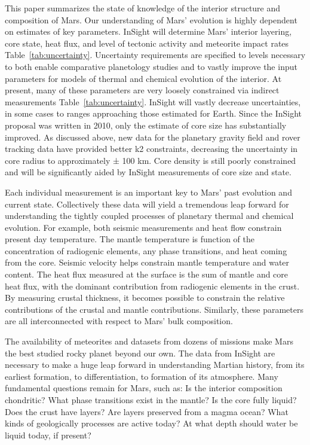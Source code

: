 This paper summarizes the state of knowledge of the interior structure and composition of Mars.  Our understanding of Mars’ evolution is highly dependent on estimates of key parameters.  InSight will determine Mars’ interior layering, core state, heat flux, and level of tectonic activity and meteorite impact rates Table~\ref{tab:uncertainty}. Uncertainty requirements are specified to levels necessary to both enable comparative planetology studies and to vastly improve the input parameters for models of thermal and chemical evolution of the interior.  At present, many of these parameters are very loosely constrained via indirect measurements Table~\ref{tab:uncertainty}. InSight will vastly decrease uncertainties, in some cases to ranges approaching those estimated for Earth.  Since the InSight proposal was written in 2010, only the estimate of core size has substantially improved.  As discussed above, new data for the planetary gravity field and rover tracking data have provided better k2 constraints, decreasing the uncertainty in core radius to approximately ± 100 km.  Core density is still poorly constrained and will be significantly aided by InSight measurements of core size and state.

Each individual measurement is an important key to Mars’ past evolution and current state. Collectively these data will yield a tremendous leap forward for understanding the tightly coupled processes of planetary thermal and chemical evolution.  For example, both seismic measurements and heat flow constrain present day temperature.   The mantle temperature is function of the concentration of radiogenic elements, any phase transitions, and heat coming from the core.  Seismic velocity helps constrain mantle temperature and water content.  The heat flux measured at the surface is the sum of mantle and core heat flux, with the dominant contribution from radiogenic elements in the crust.  By measuring crustal thickness, it becomes possible to constrain the relative contributions of the crustal and mantle contributions.  Similarly, these parameters are all interconnected with respect to Mars’ bulk composition.

The availability of meteorites and datasets from dozens of missions make Mars the best studied rocky planet beyond our own.  The data from InSight are necessary to make a huge leap forward in understanding Martian history, from its earliest formation, to differentiation, to formation of its atmosphere.  Many fundamental questions remain for Mars, such as: Is the interior composition chondritic? What phase transitions exist in the mantle?  Is the core fully liquid? Does the crust have layers? Are layers preserved from a magma ocean? What kinds of geologically processes are active today?  At what depth should water be liquid today, if present?  

